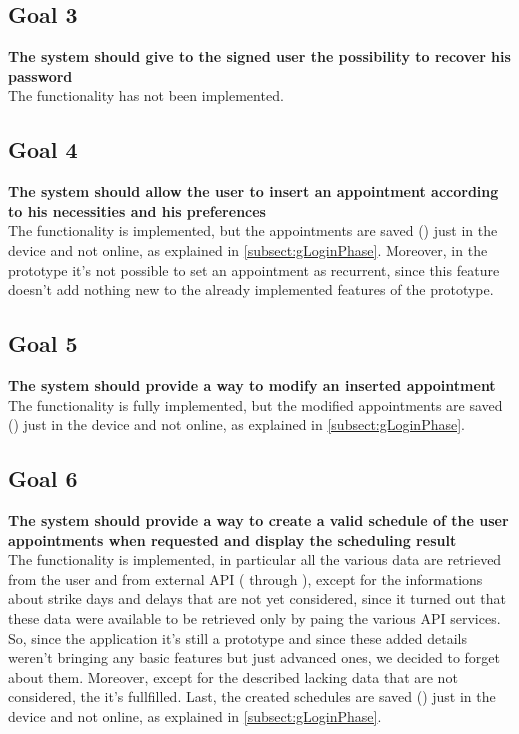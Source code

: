 \subsection{Goal 3} \label{subsect:gPasswordRecovery}
\textbf{The system should give to the signed user the possibility to recover his password} \\

The functionality has not been implemented.

\subsection{Goal 4} \label{subsect:gAppointmentCreation}
\textbf{The system should allow the user to insert an appointment according to his necessities and his preferences}\\

The functionality is implemented, but the appointments are saved () just in the device and not online, as explained in \ref{subsect:gLoginPhase}. Moreover, in the prototype it's not possible to set an appointment as recurrent, since this feature doesn't add nothing new to the already implemented features of the prototype.

\subsection{Goal 5} \label{subsect:gAppointmentModification}
\textbf{The system should provide a way to modify an inserted appointment}\\

The functionality is fully implemented, but the modified appointments are saved () just in the device and not online, as explained in \ref{subsect:gLoginPhase}.

\subsection{Goal 6}
\label{subsect:gScheduleCreation}
\textbf{The system should provide a way to create a valid schedule of the user appointments when requested and display the scheduling result}\\

The functionality is implemented, in particular all the various data are retrieved from the user and from external API ( through ), except for the informations about strike days and delays that are not yet considered, since it turned out that these data were available to be retrieved only by paing the various API services. So, since the application it's still a prototype and since these added details weren't bringing any basic features but just advanced ones, we decided to forget about them. Moreover, except for the described lacking data that are not considered, the  it's fullfilled. Last, the created schedules are saved () just in the device and not online, as explained in \ref{subsect:gLoginPhase}.


